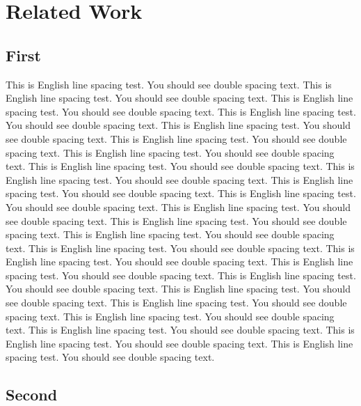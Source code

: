 \chapter{Related Work}
\label{c:related}

\section{First}
\label{s:related1}

This is English line spacing test. You should see double spacing text.
This is English line spacing test. You should see double spacing text.
This is English line spacing test. You should see double spacing text.
This is English line spacing test. You should see double spacing text.
This is English line spacing test. You should see double spacing text.
This is English line spacing test. You should see double spacing text.
This is English line spacing test. You should see double spacing text.
This is English line spacing test. You should see double spacing text.
This is English line spacing test. You should see double spacing text.
This is English line spacing test. You should see double spacing text.
This is English line spacing test. You should see double spacing text.
This is English line spacing test. You should see double spacing text.
This is English line spacing test. You should see double spacing text.
This is English line spacing test. You should see double spacing text.
This is English line spacing test. You should see double spacing text.
This is English line spacing test. You should see double spacing text.
This is English line spacing test. You should see double spacing text.
This is English line spacing test. You should see double spacing text.
This is English line spacing test. You should see double spacing text.
This is English line spacing test. You should see double spacing text.
This is English line spacing test. You should see double spacing text.
This is English line spacing test. You should see double spacing text.
This is English line spacing test. You should see double spacing text.
This is English line spacing test. You should see double spacing text.

\section{Second}

